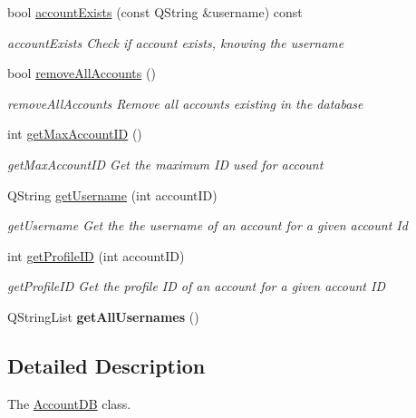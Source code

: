 \begin{DoxyCompactItemize}
\item 
bool \hyperlink{classAccountDB_a94dea7bc1945a33c3abbdcaae1599773}{account\+Exists} (const Q\+String \&username) const 
\begin{DoxyCompactList}\small\item\em account\+Exists Check if account exists, knowing the username \end{DoxyCompactList}\item 
bool \hyperlink{classAccountDB_a951cc093240e88b375cdd99fac34a8eb}{remove\+All\+Accounts} ()
\begin{DoxyCompactList}\small\item\em remove\+All\+Accounts Remove all accounts existing in the database \end{DoxyCompactList}\item 
int \hyperlink{classAccountDB_a0c9428fda76a5b42b0d0f946bbc2e5f4}{get\+Max\+Account\+ID} ()
\begin{DoxyCompactList}\small\item\em get\+Max\+Account\+ID Get the maximum ID used for account \end{DoxyCompactList}\item 
Q\+String \hyperlink{classAccountDB_a0fa422135d200d2bb78f29de5beb4fdc}{get\+Username} (int account\+ID)
\begin{DoxyCompactList}\small\item\em get\+Username Get the the username of an account for a given account Id \end{DoxyCompactList}\item 
int \hyperlink{classAccountDB_adfc1ccfe39ac55e1b2497d7fab725862}{get\+Profile\+ID} (int account\+ID)
\begin{DoxyCompactList}\small\item\em get\+Profile\+ID Get the profile ID of an account for a given account ID \end{DoxyCompactList}\item 
Q\+String\+List {\bfseries get\+All\+Usernames} ()\hypertarget{classAccountDB_a430e10b36e5164866dd53ad8e8b32319}{}\label{classAccountDB_a430e10b36e5164866dd53ad8e8b32319}

\end{DoxyCompactItemize}


\subsection{Detailed Description}
The \hyperlink{classAccountDB}{Account\+DB} class. 

